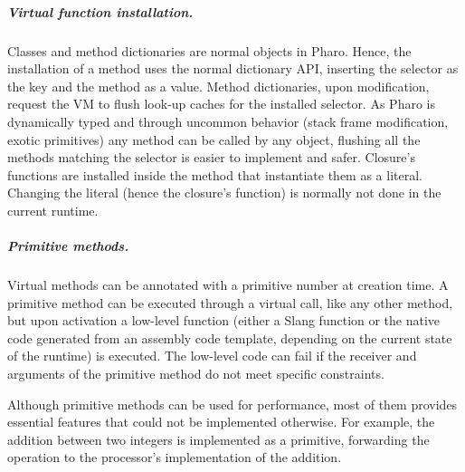 \documentclass[a4paper,12pt,twoside]{../includes/ThesisStyle}
\begin{document}







\subparagraph{Virtual function installation.}

Classes and method dictionaries are normal objects in Pharo. Hence, the installation of a method uses the normal dictionary API, inserting the selector as the key and the method as a value. Method dictionaries, upon modification, request the VM to flush look-up caches for the installed selector. As Pharo is dynamically typed and through uncommon behavior (stack frame modification, exotic primitives) any method can be called by any object, flushing all the methods matching the selector is easier to implement and safer. Closure's functions are installed inside the method that instantiate them as a literal. Changing the literal (hence the closure's function) is normally not done in the current runtime.

\subparagraph{Primitive methods.}

Virtual methods can be annotated with a primitive number at creation time. A primitive method can be executed through a virtual call, like any other method, but upon activation a low-level function (either a Slang function or the native code generated from an assembly code template, depending on the current state of the runtime) is executed. The low-level code can fail if the receiver and arguments of the primitive method do not meet specific constraints. 

Although primitive methods can be used for performance, most of them provides essential features that could not be implemented otherwise. For example, the addition between two integers is implemented as a primitive, forwarding the operation to the processor's implementation of the addition.
\end{document}
